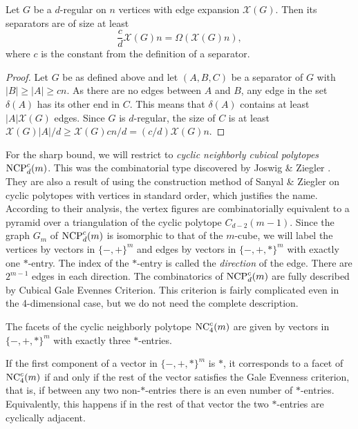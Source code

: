 \begin{lemma}
\label{separatorsize}
Let $G$ be a $d$-regular on $n$ vertices with edge expansion $\mathcal{X}(G)$.
Then its separators are of size at least
\begin{equation}
	\frac{c}{d}\mathcal{X}(G)n = \Omega(\mathcal{X}(G)n),
\end{equation}
where $c$ is the constant from the definition of a separator.
\end{lemma}
\begin{proof}
Let $G$ be as defined above and let $(A,B,C)$ be a separator of $G$ with $|B| \ge |A| \ge cn$.
As there are no edges between $A$ and $B$, any edge in the set $\delta(A)$ has its other end in
$C$. This means that $\delta(A)$ contains at least $|A|\mathcal{X}(G)$ edges. Since $G$ is $d$-regular,
the size of $C$ is at least $\mathcal{X}(G)|A|/d \ge \mathcal{X}(G)cn/d = (c/d)\mathcal{X}(G)n$.  
\end{proof}

For the sharp bound, we will restrict to \textit{cyclic neighborly cubical polytopes} 
 $\textrm{NCP}^c_d(m)$.
This was the combinatorial type discovered by Joswig \& Ziegler \cite{Z62}. They
are also a result of using the construction method of Sanyal \& Ziegler \cite{Z102}
on cyclic polytopes with vertices in standard order, which justifies the name.  According
to their analysis, the vertex figures are combinatorially equivalent to a pyramid over
a triangulation of the cyclic polytope $C_{d-2}(m-1)$. Since the graph $G_m$ of $\textrm{NCP}^c_d(m)$
is isomorphic to that of the $m$-cube, we will label the vertices by vectors in $\{-,+\}^m$ and
edges by vectors in $\{-,+,*\}^m$ with exactly one $*$-entry. The index of the $*$-entry is
called the \textit{direction} of the edge. There are $2^{m-1}$ edges in each direction.
The combinatorics of $\textrm{NCP}^c_d(m)$ are fully described by Cubical Gale Evennes Criterion.
This criterion is fairly complicated even in the 4-dimensional case, but we do not need the 
complete description.

\begin{theorem}
[Part of the Cubical Gale Evenness Criterion, for $d=4$ {\cite[Thm.~18]{Z62}}] 
The facets of the cyclic neighborly polytope $\mathrm{NC}^c_4(m)$ are given by vectors in
$\{-,+,*\}^m$ with exactly three $*$-entries. 

If the first component of a vector in $\{-,+,*\}^m$ is $*$, it corresponds to a facet 
of $\mathrm{NC}^c_4(m)$ if and only if the rest of the vector satisfies the Gale Evenness criterion, 
that is, if between any two non-$*$-entries there is an even number of $*$-entries.
Equivalently, this happens if in the rest of that vector the two $*$-entries are
cyclically adjacent.
\end{theorem}

